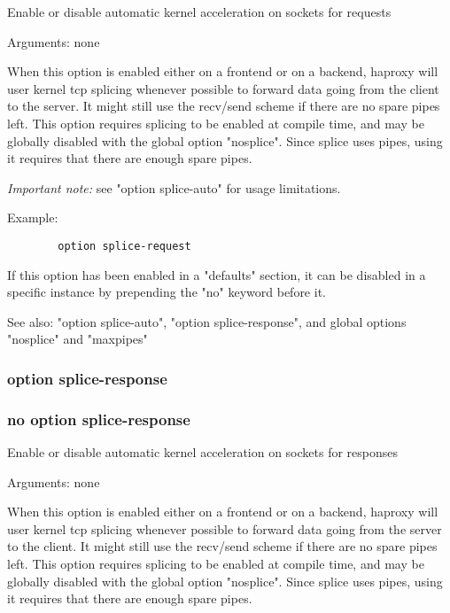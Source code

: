 
  Enable or disable automatic kernel acceleration on sockets for requests


  Arguments: none

  When this option is enabled either on a frontend or on a backend, haproxy
  will user kernel tcp splicing whenever possible to forward data going from
  the client to the server. It might still use the recv/send scheme if there
  are no spare pipes left. This option requires splicing to be enabled at
  compile time, and may be globally disabled with the global option "nosplice".
  Since splice uses pipes, using it requires that there are enough spare pipes.

  \emph{Important note:} see "option splice-auto" for usage limitations.

  Example:
  \begin{verbatim}
        option splice-request
  \end{verbatim}
  
  If this option has been enabled in a "defaults" section, it can be disabled
  in a specific instance by prepending the "no" keyword before it.

  See also: "option splice-auto", "option splice-response", and global options
             "nosplice" and "maxpipes"

\subsubsection{option splice-response}
\subsubsection{no option splice-response}


  Enable or disable automatic kernel acceleration on sockets for responses


  Arguments: none

  When this option is enabled either on a frontend or on a backend, haproxy
  will user kernel tcp splicing whenever possible to forward data going from
  the server to the client. It might still use the recv/send scheme if there
  are no spare pipes left. This option requires splicing to be enabled at
  compile time, and may be globally disabled with the global option "nosplice".
  Since splice uses pipes, using it requires that there are enough spare pipes.


